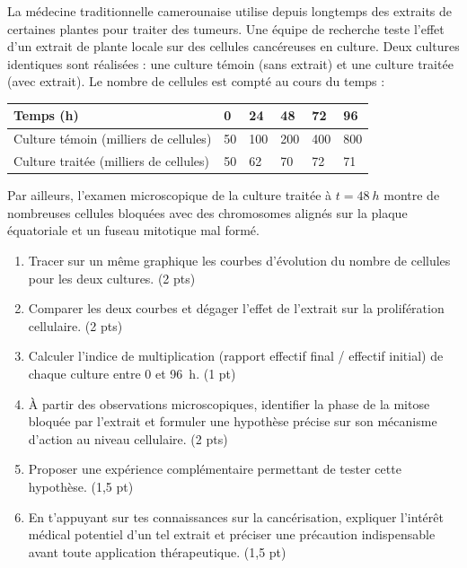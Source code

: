 \documentclass[11pt]{article}
\begin{document}
\begin{exercice}
La médecine traditionnelle camerounaise utilise depuis longtemps des extraits de certaines plantes pour traiter des tumeurs. Une équipe de recherche teste l'effet d'un extrait de plante locale sur des cellules cancéreuses en culture. Deux cultures identiques sont réalisées : une culture témoin (sans extrait) et une culture traitée (avec extrait). Le nombre de cellules est compté au cours du temps :
\begin{center}
\begin{tabularx}{\linewidth}{|l|X|X|X|X|X|}
\hline
\rowcolor{popblueL} Temps (h) & 0 & 24 & 48 & 72 & 96 \\
\hline
Culture témoin (milliers de cellules) & 50 & 100 & 200 & 400 & 800 \\
\hline
Culture traitée (milliers de cellules) & 50 & 62 & 70 & 72 & 71 \\
\hline
\end{tabularx}
\end{center}
Par ailleurs, l'examen microscopique de la culture traitée à $t = \SI{48}{h}$ montre de nombreuses cellules bloquées avec des chromosomes alignés sur la plaque équatoriale et un fuseau mitotique mal formé.
\begin{enumerate}
\item Tracer sur un même graphique les courbes d'évolution du nombre de cellules pour les deux cultures. \hfill (2 pts)
\item Comparer les deux courbes et dégager l'effet de l'extrait sur la prolifération cellulaire. \hfill (2 pts)
\item Calculer l'indice de multiplication (rapport effectif final / effectif initial) de chaque culture entre 0 et \SI{96}{h}. \hfill (1 pt)
\item À partir des observations microscopiques, identifier la phase de la mitose bloquée par l'extrait et formuler une hypothèse précise sur son mécanisme d'action au niveau cellulaire. \hfill (2 pts)
\item Proposer une expérience complémentaire permettant de tester cette hypothèse. \hfill (1,5 pt)
\item En t'appuyant sur tes connaissances sur la cancérisation, expliquer l'intérêt médical potentiel d'un tel extrait et préciser une précaution indispensable avant toute application thérapeutique. \hfill (1,5 pt)
\end{enumerate}
\end{exercice}
\end{document}
